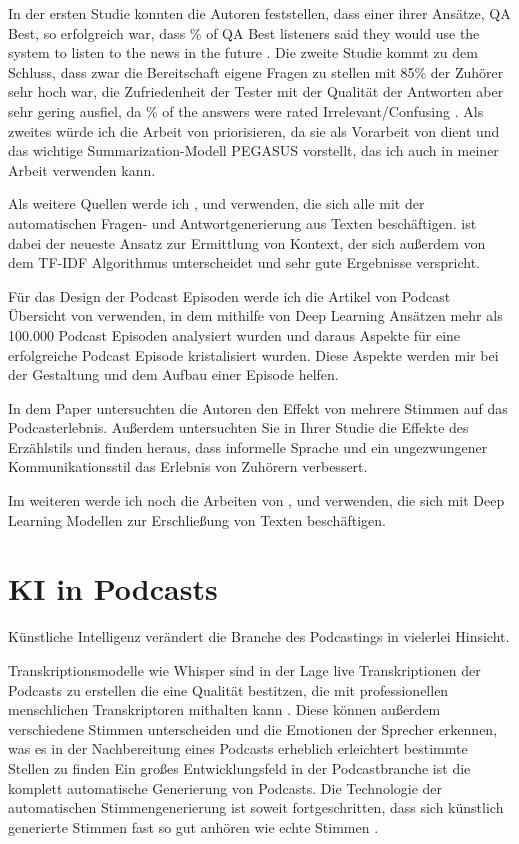 In der ersten Studie konnten die Autoren feststellen, dass einer ihrer Ansätze, QA Best,  so erfolgreich war, dass \% of QA Best listeners said they would use the system to listen to the news in the future\grqq{}  \cite{laban2022}.
Die zweite Studie kommt zu dem Schluss, dass zwar die Bereitschaft eigene Fragen zu stellen mit 85\% der Zuhörer sehr hoch war, die Zufriedenheit der Tester mit der Qualität der Antworten aber sehr gering ausfiel, da \% of the answers were rated Irrelevant/Confusing\grqq{} \cite{laban2022}.
Als zweites würde ich die Arbeit von \cite{zhang2020} priorisieren, da sie als Vorarbeit von \cite{laban2022} dient und das wichtige Summarization-Modell PEGASUS vorstellt, das ich auch in meiner Arbeit verwenden kann.

Als weitere Quellen werde ich \cite{karpukhin2020}, \cite{reddy2019} und \cite{choi2018} verwenden, die sich alle mit der automatischen Fragen- und Antwortgenerierung aus Texten beschäftigen.
\cite{karpukhin2020} ist dabei der neueste Ansatz zur Ermittlung von Kontext, der sich außerdem von dem TF-IDF Algorithmus unterscheidet und sehr gute Ergebnisse verspricht.

Für das Design der Podcast Episoden werde ich die Artikel von Podcast Übersicht von \cite{jones2021} verwenden, in dem mithilfe von Deep Learning Ansätzen mehr als 100.000 Podcast Episoden analysiert wurden und daraus Aspekte für eine erfolgreiche Podcast Episode kristalisiert wurden. Diese Aspekte werden mir bei der Gestaltung und dem Aufbau einer Episode helfen. 

In dem Paper \cite{kang2012} untersuchten die Autoren den Effekt von mehrere Stimmen auf das Podcasterlebnis. Außerdem untersuchten Sie in Ihrer Studie die Effekte des Erzählstils und finden heraus, dass informelle Sprache und ein ungezwungener Kommunikationsstil das Erlebnis von Zuhörern verbessert. 

Im weiteren werde ich noch die Arbeiten von \cite{maroni2020}, \cite{clark2020} und \cite{du2017} verwenden, die sich mit Deep Learning Modellen zur Erschließung von Texten beschäftigen.



\section{KI in Podcasts}

Künstliche Intelligenz verändert die Branche des Podcastings in vielerlei Hinsicht. 

Transkriptionsmodelle wie Whisper sind in der Lage live Transkriptionen der Podcasts zu erstellen die eine Qualität bestitzen, die mit professionellen menschlichen Transkriptoren mithalten kann \cite{radford}.
Diese können außerdem verschiedene Stimmen unterscheiden und die Emotionen der Sprecher erkennen, was es in der Nachbereitung eines Podcasts erheblich erleichtert bestimmte Stellen zu finden \cite{wagner2023}
Ein großes Entwicklungsfeld in der Podcastbranche ist die komplett automatische Generierung von Podcasts. Die Technologie der automatischen Stimmengenerierung ist soweit fortgeschritten, dass sich künstlich generierte Stimmen fast so gut anhören wie echte Stimmen \cite{shi2023}.


